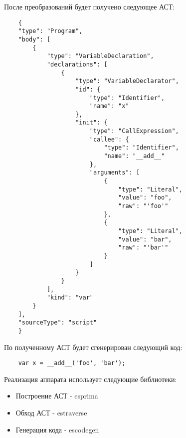 После преобразований будет получено следующее АСТ:

\bigskip
\begin{lstlisting}
	{
    "type": "Program",
    "body": [
        {
            "type": "VariableDeclaration",
            "declarations": [
                {
                    "type": "VariableDeclarator",
                    "id": {
                        "type": "Identifier",
                        "name": "x"
                    },
                    "init": {
                        "type": "CallExpression",
                        "callee": {
                            "type": "Identifier",
                            "name": "__add__"
                        },
                        "arguments": [
                            {
                                "type": "Literal",
                                "value": "foo",
                                "raw": "'foo'"
                            },
                            {
                                "type": "Literal",
                                "value": "bar",
                                "raw": "'bar'"
                            }
                        ]
                    }
                }
            ],
            "kind": "var"
        }
    ],
    "sourceType": "script"
	}
\end{lstlisting}


По полученному АСТ будет сгенерирован следующий код:

\bigskip
\begin{lstlisting}
	var x = __add__('foo', 'bar');
\end{lstlisting}


Реализация аппарата использует следующие библиотеки:

\begin{itemize}
	\item Построение АСТ - esprima
	\item Обход АСТ - estraverse
	\item Генерация кода -  escodegen
\end{itemize}



